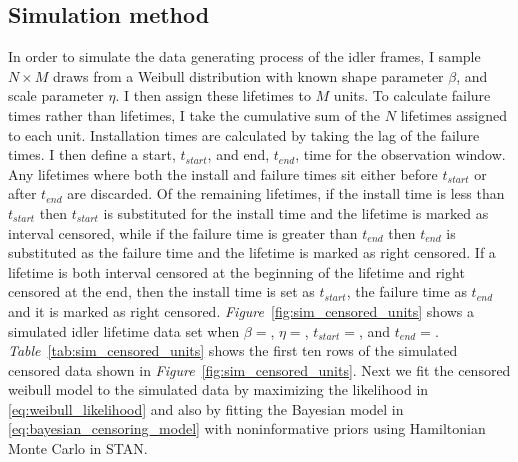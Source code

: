 \subsection{Simulation method}

In order to simulate the data generating process of the idler frames, I sample $N \times M$ draws from a Weibull distribution with known shape parameter $\beta$, and scale parameter $\eta$. I then assign these lifetimes to $M$ units. To calculate failure times rather than lifetimes, I take the cumulative sum of the $N$ lifetimes assigned to each unit. Installation times are calculated by taking the lag of the failure times. I then define a start, $t_{start}$, and end, $t_{end}$, time for the observation window. Any lifetimes where both the install and failure times sit either before $t_{start}$ or after $t_{end}$ are discarded. Of the remaining lifetimes, if the install time is less than $t_{start}$ then $t_{start}$ is substituted for the install time and the lifetime is marked as interval censored, while if the failure time is greater than $t_{end}$ then $t_{end}$ is substituted as the failure time and the lifetime is marked as right censored. If a lifetime is both interval censored at the beginning of the lifetime and right censored at the end, then the install time is set as $t_{start}$, the failure time as $t_{end}$ and it is marked as right censored. \textit{Figure}~\ref{fig:sim_censored_units} shows a simulated idler lifetime data set when $\beta = $, $\eta = $, $t_{start} = $, and $t_{end} = $. \textit{Table}~\ref{tab:sim_censored_units} shows the first ten rows of the simulated censored data shown in \textit{Figure}~\ref{fig:sim_censored_units}. Next we fit the censored weibull model to the simulated data by maximizing the likelihood in \ref{eq:weibull_likelihood} and also by fitting the Bayesian model in \ref{eq:bayesian_censoring_model} with noninformative priors using Hamiltonian Monte Carlo in STAN.

